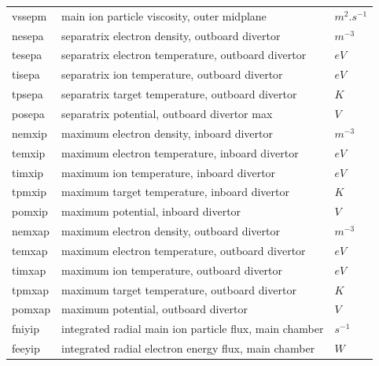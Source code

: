 \documentclass[a4paper,10pt]{report}
\begin{document}
\begin{center}
\begin{longtable}{|l|l|l|}
vssepm \index{vssepm}\index{b2time.nc, vssepm} & main ion particle viscosity, outer midplane & $m^2.s^{-1}$ \\
nesepa \index{nesepa}\index{b2time.nc, nesepa} & separatrix electron density, outboard divertor & $m^{-3}$ \\
tesepa \index{tesepa}\index{b2time.nc, tesepa} & separatrix electron temperature, outboard divertor & $eV$ \\
tisepa \index{tisepa}\index{b2time.nc, tisepa} & separatrix ion temperature, outboard divertor & $eV$ \\
tpsepa \index{tpsepa}\index{b2time.nc, tpsepa} & separatrix target temperature, outboard divertor & $K $ \\
posepa \index{posepa}\index{b2time.nc, posepa} & separatrix potential, outboard divertor max & $V $ \\
nemxip \index{nemxip}\index{b2time.nc, nemxip} & maximum electron density, inboard divertor & $m^{-3}$ \\
temxip \index{temxip}\index{b2time.nc, temxip} & maximum electron temperature, inboard divertor & $eV$ \\
timxip \index{timxip}\index{b2time.nc, timxip} & maximum ion temperature, inboard divertor & $eV$ \\
tpmxip \index{tpmxip}\index{b2time.nc, tpmxip} & maximum target temperature, inboard divertor & $K $ \\
pomxip \index{pomxip}\index{b2time.nc, pomxip} & maximum potential, inboard divertor & $V $ \\
nemxap \index{nemxap}\index{b2time.nc, nemxap} & maximum electron density, outboard divertor & $m^{-3}$ \\
temxap \index{temxap}\index{b2time.nc, temxap} & maximum electron temperature, outboard divertor & $eV$ \\
timxap \index{timxap}\index{b2time.nc, timxap} & maximum ion temperature, outboard divertor  & $eV$ \\
tpmxap \index{tpmxap}\index{b2time.nc, tpmxap} & maximum target temperature, outboard divertor & $K $ \\
pomxap \index{pomxap}\index{b2time.nc, pomxap} & maximum potential, outboard divertor & $V $ \\
fniyip \index{fniyip}\index{b2time.nc, fniyip} & integrated radial main ion particle flux, main chamber & $s^{-1}$ \\
feeyip \index{feeyip}\index{b2time.nc, feeyip} & integrated radial electron energy flux, main chamber & $W $ \\

\end{longtable}
\end{center}
\end{document}
